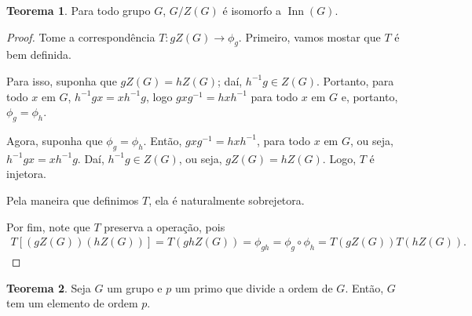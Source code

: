 \documentclass[a4paper,portuguese,11pt,twoside, leqno]{book}
\DeclareMathOperator{\inn}{Inn}
\theoremstyle{definition}
\newtheorem{theorem}{Teorema}[section]
\begin{document}
	\begin{theorem}
		Para todo grupo $G$, $G/Z(G)$ é isomorfo a $\inn(G)$.
	\end{theorem}
	
	\begin{proof}
		Tome a correspondência $T:gZ(G)\to \phi_g$. Primeiro, vamos mostar que $T$ é bem definida. 
		\par\vspace{0.3cm} Para isso, suponha que $gZ(G) = hZ(G)$; daí, $h^{-1}g\in Z(G)$. Portanto, para todo $x$ em $G$, $h^{-1}gx = xh^{-1}g$, logo $gxg^{-1} = hxh^{-1}$ para todo $x$ em $G$ e, portanto, $\phi_g = \phi_h$. 
		\par\vspace{0.3cm} Agora, suponha que $\phi_g = \phi_h$. Então, $gxg^{-1} = hxh^{-1}$, para todo $x$ em $G$, ou seja, $h^{-1}gx = xh^{-1}g$. Daí, $h^{-1}g\in Z(G)$, ou seja, $gZ(G) = hZ(G)$. Logo, $T$ é injetora.
		\par\vspace{0.3cm} Pela maneira que definimos $T$, ela é naturalmente sobrejetora. 
		\par\vspace{0.3cm} Por fim, note que $T$ preserva a operação, pois
		\begin{align*}
		T[(gZ(G))(hZ(G))] = T(ghZ(G)) = \phi_{gh} = \phi_g\circ\phi_h = T(gZ(G))T(hZ(G)).
		\end{align*}
	\end{proof}
	
	\begin{theorem}
		\label{cauchy}
		Seja $G$ um grupo e $p$ um primo que divide a ordem de $G$. Então, $G$ tem um elemento de ordem $p$.
	\end{theorem}
	
\end{document}
